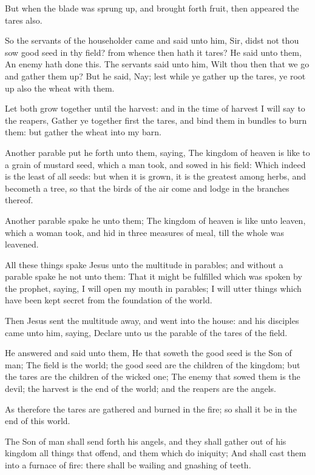 \verse But when the blade was sprung up, and brought forth fruit, then appeared the tares also.

\verse So the servants of the householder came and said unto him, Sir, didst not thou sow good seed in thy field? from whence then hath it tares?  \verse He said unto them, An enemy hath done this. The servants said unto him, Wilt thou then that we go and gather them up?  \verse But he said, Nay; lest while ye gather up the tares, ye root up also the wheat with them.

\verse Let both grow together until the harvest: and in the time of harvest I will say to the reapers, Gather ye together first the tares, and bind them in bundles to burn them: but gather the wheat into my barn.

\verse Another parable put he forth unto them, saying, The kingdom of heaven is like to a grain of mustard seed, which a man took, and sowed in his field: \verse Which indeed is the least of all seeds: but when it is grown, it is the greatest among herbs, and becometh a tree, so that the birds of the air come and lodge in the branches thereof.

\verse Another parable spake he unto them; The kingdom of heaven is like unto leaven, which a woman took, and hid in three measures of meal, till the whole was leavened.

\verse All these things spake Jesus unto the multitude in parables; and without a parable spake he not unto them: \verse That it might be fulfilled which was spoken by the prophet, saying, I will open my mouth in parables; I will utter things which have been kept secret from the foundation of the world.

\verse Then Jesus sent the multitude away, and went into the house: and his disciples came unto him, saying, Declare unto us the parable of the tares of the field.

\verse He answered and said unto them, He that soweth the good seed is the Son of man; \verse The field is the world; the good seed are the children of the kingdom; but the tares are the children of the wicked one; \verse The enemy that sowed them is the devil; the harvest is the end of the world; and the reapers are the angels.

\verse As therefore the tares are gathered and burned in the fire; so shall it be in the end of this world.

\verse The Son of man shall send forth his angels, and they shall gather out of his kingdom all things that offend, and them which do iniquity; \verse And shall cast them into a furnace of fire: there shall be wailing and gnashing of teeth.

